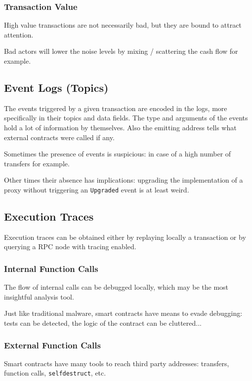 \subsubsection{Transaction Value}

High value transactions are not necessarily bad, but they are bound to attract attention.

Bad actors will lower the noise levels by mixing / scattering the cash flow for example.

\subsection{Event Logs (Topics)}

The events triggered by a given transaction are encoded in the logs, more specifically in their topics and data fields.
The type and arguments of the events hold a lot of information by themselves. Also the emitting address tells what external contracts were called if any.

Sometimes the presence of events is suspicious: in case of a high number of transfers for example.

Other times their absence has implications: upgrading the implementation of a proxy without triggering an \lstinline{Upgraded} event is at least weird.

\subsection{Execution Traces}

Execution traces can be obtained either by replaying locally a transaction or by querying a RPC node with tracing enabled.

\subsubsection{Internal Function Calls}

The flow of internal calls can be debugged locally, which may be the most insightful analysis tool.

Just like traditional malware, smart contracts have means to evade debugging: tests can be detected, the logic of the contract can be cluttered...

\subsubsection{External Function Calls}

Smart contracts have many tools to reach third party addresses: transfers, function calls, \lstinline[language=Solidity]{selfdestruct}, etc.

